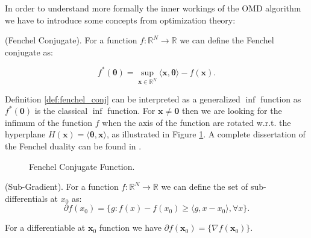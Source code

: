 In order to understand more formally the inner workings of the OMD algorithm we have to introduce some concepts from optimization theory:

\begin{definition}(Fenchel Conjugate).\label{def:fenchel_conj}
For a function $f:\mathbb R^N\to\mathbb R$ we can define the Fenchel conjugate as:

\begin{equation}
f^*(\mathbf \theta)=\sup\limits_{\mathbf x\in\mathbb R^N}\langle\mathbf x,\mathbf \theta\rangle -f(\mathbf x).
\end{equation}
\end{definition}

Definition \ref{def:fenchel_conj} can be interpreted as a generalized $\inf$ function as $f^*(\mathbf 0)$ is the classical $\inf$ function. For $\mathbf x\neq\mathbf 0$ then we are looking for the infimum of the function $f$ when the axis of the function are rotated w.r.t. the hyperplane $H(\mathbf x)=\langle\mathbf\theta,\mathbf x\rangle$, as illustrated in Figure \ref{fig:fenchel}. A complete dissertation of the Fenchel duality can be found in \cite{rockafellar1970convex}.

\begin{figure}[!ht]
\centering

\caption{Fenchel Conjugate Function.}
\label{fig:fenchel}
\end{figure}


\begin{definition}(Sub-Gradient).\label{def:subgradient}
For a function $f:\mathbb R^N\to\mathbb R$ we can define the set of sub-differentials at $x_0$ as:
\begin{equation}
\partial f(x_0) = \{g : f(x)-f(x_0) \ge \langle g, x - x_0\rangle,\forall x\}.
\end{equation}
\end{definition}

For a differentiable at $\mathbf x_0$ function we have $\partial f(\mathbf x_0)=\{\nabla f(\mathbf x_0)\}$.



